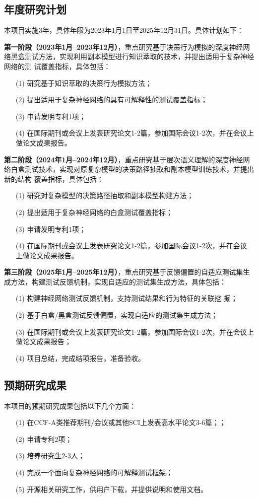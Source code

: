 \subsection{年度研究计划}
本项目实施3年，具体年限为2023年1月1日至2025年12月31日。具体计划如下：

\textbf{第一阶段（2023年1月--2023年12月）}，重点研究基于决策行为模拟的深度神经网
络黑盒测试方法，实现利用副本模型进行知识萃取的技术，并提出适用于复杂神经网络的测
试覆盖指标，具体包括：
\begin{itemize}[itemindent=2em]
    \item[(1)] 研究基于知识萃取的决策行为模拟方法；
    \item[(2)] 提出适用于复杂神经网络的具有可解释性的测试覆盖指标； 
    \item[(3)] 申请发明专利1项；
    \item[(4)] 在国际期刊或会议上发表研究论文1-2篇，参加国际会议1-2次，并在会议上
    做论文成果报告。
\end{itemize}

\textbf{第二阶段（2024年1月--2024年12月）}，重点研究基于层次语义理解的深度神经网
络白盒测试技术，实现对原复杂模型的决策路径抽取和副本模型训练技术，并提出新的结构
覆盖指标，具体包括：
\begin{itemize}[itemindent=2em]
    \item[(1)] 研究对复杂模型的决策路径抽取和副本模型构建方法；
    \item[(2)] 提出适用于复杂神经网络的白盒测试覆盖指标； 
    \item[(3)] 申请发明专利1项；
    \item[(4)] 在国际期刊或会议上发表研究论文1-2篇，参加国际会议1-2次，并在会议
    上做论文成果报告。
\end{itemize}

\textbf{第三阶段（2025年1月--2025年12月）}，重点研究基于反馈偏置的自适应测试集生
成方法，构建测试反馈机制，实现自适应的测试集生成方法，具体包括：
\begin{itemize}[itemindent=2em]
    \item[(1)] 构建神经网络测试反馈机制，支持测试结果和行为特征的关联挖
    掘；
    \item[(2)] 基于白盒/黑盒测试反馈偏置，实现自适应的测试集生成方法；
    \item[(3)] 在国际期刊或会议上发表研究论文1-2篇，参加国际会议1-2次，并在会议上
    做论文成果报告； 
    \item[(4)] 项目总结，完成结项报告，准备验收。
\end{itemize}

\subsection{预期研究成果}

本项目的预期研究成果包括以下几个方面：
\begin{itemize}[itemindent=2em]
    \item[(1)] 在CCF-A类推荐期刊/会议或其他SCI上发表高水平论文3-6篇；；
    \item[(2)] 申请专利2项；
    \item[(3)] 培养研究生2-3人； 
    \item[(4)] 完成一个面向复杂神经网络的可解释测试框架；
    \item[(5)] 开源相关研究工作，供用户下载，并提供说明和使用文档。
\end{itemize}
